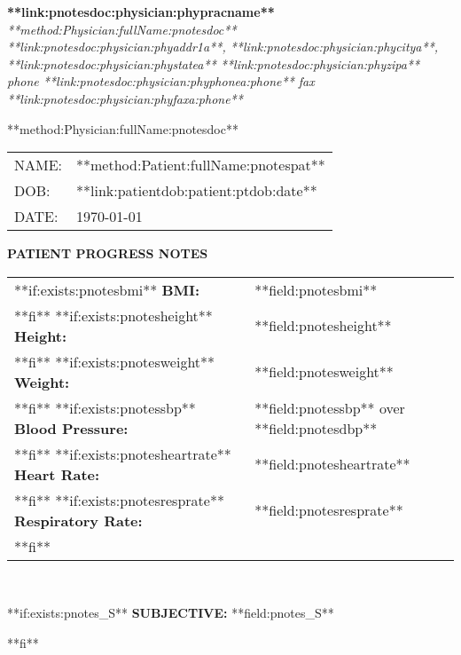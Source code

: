 \documentclass{article}
\newcommand{\sheading}[1]{\textbf{#1:}}
\begin{document}
\begin{center}
        {\textbf{**link:pnotesdoc:physician:phypracname**}} \\
        {\textsl{**method:Physician:fullName:pnotesdoc**}} \\
        \textsl{**link:pnotesdoc:physician:phyaddr1a**, **link:pnotesdoc:physician:phycitya**, **link:pnotesdoc:physician:phystatea** **link:pnotesdoc:physician:phyzipa** } \\
        \textsl{phone **link:pnotesdoc:physician:phyphonea:phone** fax **link:pnotesdoc:physician:phyfaxa:phone**}
\end{center}

**method:Physician:fullName:pnotesdoc** \\
\begin{tabular}{ll}
	NAME:	&	**method:Patient:fullName:pnotespat**	\\
	DOB:	&	**link:patientdob:patient:ptdob:date**	\\
	DATE:	&	\today
\end{tabular}

\begin{center}
	{\textbf{PATIENT PROGRESS NOTES}}
\end{center}

\begin{tabular}{ll}
**if:exists:pnotesbmi**
\sheading{BMI} & **field:pnotesbmi** \\
**fi**
**if:exists:pnotesheight**
\sheading{Height} & **field:pnotesheight** \\
**fi**
**if:exists:pnotesweight**
\sheading{Weight} & **field:pnotesweight** \\
**fi**
**if:exists:pnotessbp**
\sheading{Blood Pressure} & **field:pnotessbp** over **field:pnotesdbp** \\
**fi**
**if:exists:pnotesheartrate**
\sheading{Heart Rate} & **field:pnotesheartrate** \\
**fi**
**if:exists:pnotesresprate**
\sheading{Respiratory Rate} & **field:pnotesresprate** \\
**fi**
\  &  \  
\end{tabular} \\
\par


**if:exists:pnotes_S**
\sheading{SUBJECTIVE} **field:pnotes_S**
\par
**fi**
\end{document}
